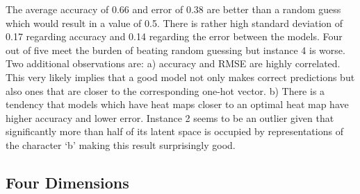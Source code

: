 The average accuracy of 0.66 and error of 0.38 are better than a random guess which would result in a value of 0.5. There is rather high standard deviation of 0.17 regarding accuracy and 0.14 regarding the error between the models. Four out of five meet the burden of beating random guessing but  instance 4 is worse. Two additional observations are: a) accuracy and RMSE are highly correlated. This very likely implies that a good model not only makes correct predictions but also ones that are closer to the corresponding one-hot vector. b) There is a tendency that models which have heat maps closer to an optimal heat map have higher accuracy and lower error. Instance 2 seems to be an outlier given that significantly more than half of its latent space is occupied by representations of the character `b' making this result surprisingly good.

\subsection{Four Dimensions}

